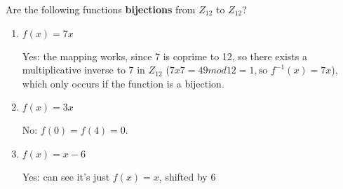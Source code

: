 \question Are the following functions \textbf{bijections} from 
$Z_{12}$ to $Z_{12}$?
\begin{enumerate}[label=\alph*.]
\item $f(x) = 7x$
\begin{solution}[0.15 in]
Yes: the mapping works, since 7 is coprime to 12, so there exists a 
multiplicative inverse to 7 in $Z_{12}$ ($7 x 7 = 49 mod 12 = 1, 
\text{so } f^{-1}(x) = 7x$), which only occurs if the function is a bijection.
\end{solution}
\item $f(x) = 3x$
\begin{solution}[0.15 in]
 No: $f(0) = f(4) = 0. $
\end{solution}
\item $f(x) = x - 6$
\begin{solution}[0.15 in]
Yes: can see it’s just $f(x) = x$, shifted by 6
\end{solution}
\end{enumerate}
